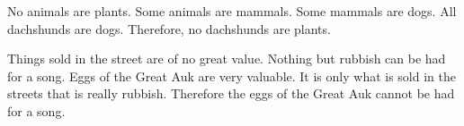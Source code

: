{\begin{exercises}


\item No animals are plants. Some animals are mammals. Some mammals are dogs. All dachshunds are dogs. Therefore, no dachshunds are plants.




\item \label{itm:Auk} Things sold in the street are of no great value. Nothing but rubbish can be had for a song. Eggs of the Great Auk are very valuable. It is only what is sold in the streets that is really rubbish. Therefore the eggs of the Great Auk cannot be had for a song.


\end{exercises}}
